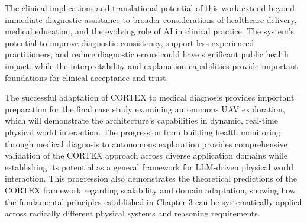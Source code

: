 The clinical implications and translational potential of this work extend beyond immediate diagnostic assistance to broader considerations of healthcare delivery, medical education, and the evolving role of AI in clinical practice. The system's potential to improve diagnostic consistency, support less experienced practitioners, and reduce diagnostic errors could have significant public health impact, while the interpretability and explanation capabilities provide important foundations for clinical acceptance and trust.

The successful adaptation of CORTEX to medical diagnosis provides important preparation for the final case study examining autonomous UAV exploration, which will demonstrate the architecture's capabilities in dynamic, real-time physical world interaction. The progression from building health monitoring through medical diagnosis to autonomous exploration provides comprehensive validation of the CORTEX approach across diverse application domains while establishing its potential as a general framework for LLM-driven physical world interaction. This progression also demonstrates the theoretical predictions of the CORTEX framework regarding scalability and domain adaptation, showing how the fundamental principles established in Chapter 3 can be systematically applied across radically different physical systems and reasoning requirements.